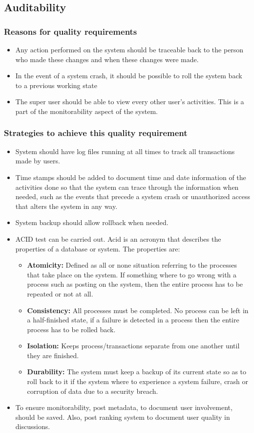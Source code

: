 \documentclass[12pt]{article}
\begin{document}
 \subsection{Auditability}
 \subsubsection{Reasons for quality requirements}
 \begin{itemize}
 \item Any action performed on the system should be traceable back to the person who made these changes and when these changes were made.
 \item In the event of a system crash, it should be possible to roll the system back to a previous working state
 \item The super user should be able to view every other user's activities. This is a part of the monitorability aspect of the system.
 \end{itemize}
 \subsubsection{Strategies to achieve this quality requirement}
 \begin{itemize}
 \item System should have log files running at all times to track all transactions made by users. 
 \item Time stamps should be added to document time and date information of the activities done so that the system can trace through the
information when needed, such as the events that precede a system crash or unauthorized access
that alters the system in any way.
\item System backup should allow rollback when needed.
\item ACID test can be carried out. Acid is an acronym that describes the properties of a database or system. The properties are:
	\begin{itemize}
	\item \textbf{Atomicity:} Defined as all or none situation referring to the processes that take place on the 
	   system. If something where to go wrong with a process such as posting on the system,
	   then the entire process has to be repeated or not at all.
	\item \textbf{Consistency:} All processes must be completed. No process can be left in a half-finished state,
	     if a failure is detected in a process then the entire process has to be rolled back.
	\item \textbf{Isolation:} Keeps process/transactions separate from one another until they are finished.
	\item \textbf{Durability:} The system must keep a backup of its current state so as to roll back to it if
	    the system where to experience a system failure, crash or corruption of data due
	    to a security breach.
	\end{itemize}
\item To ensure monitorability, post metadata, to document user involvement, should be saved. Also, post ranking system to document user quality in discussions.
 \end{itemize}
\end{document}
